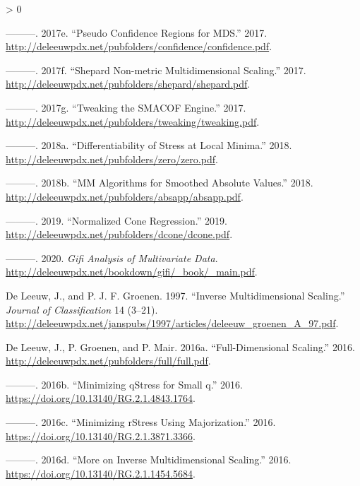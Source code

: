 \documentclass[
  12pt,
]{book}
\newlength{\cslhangindent}
\newenvironment{CSLReferences}[2] %
 {%
  \setlength{\parindent}{0pt}
  \ifodd #1 \everypar{\setlength{\hangindent}{\cslhangindent}}\ignorespaces\fi
  \ifnum #2 > 0
  \setlength{\parskip}{#2\baselineskip}
  \fi
 }%
 {}
\theoremstyle{definition}
\theoremstyle{definition}
\theoremstyle{definition}
\theoremstyle{definition}
\theoremstyle{remark}
\begin{document}
\begin{CSLReferences}{1}{0}
\leavevmode\hypertarget{ref-deleeuw_E_17q}{}%
---------. 2017e. {``{Pseudo Confidence Regions for MDS}.''} 2017. \url{http://deleeuwpdx.net/pubfolders/confidence/confidence.pdf}.

\leavevmode\hypertarget{ref-deleeuw_E_17e}{}%
---------. 2017f. {``{Shepard Non-metric Multidimensional Scaling}.''} 2017. \url{http://deleeuwpdx.net/pubfolders/shepard/shepard.pdf}.

\leavevmode\hypertarget{ref-deleeuw_E_17p}{}%
---------. 2017g. {``{Tweaking the SMACOF Engine}.''} 2017. \url{http://deleeuwpdx.net/pubfolders/tweaking/tweaking.pdf}.

\leavevmode\hypertarget{ref-deleeuw_E_18c}{}%
---------. 2018a. {``{Differentiability of Stress at Local Minima}.''} 2018. \url{http://deleeuwpdx.net/pubfolders/zero/zero.pdf}.

\leavevmode\hypertarget{ref-deleeuw_E_18f}{}%
---------. 2018b. {``{MM Algorithms for Smoothed Absolute Values}.''} 2018. \url{http://deleeuwpdx.net/pubfolders/absapp/absapp.pdf}.

\leavevmode\hypertarget{ref-deleeuw_E_19d}{}%
---------. 2019. {``Normalized Cone Regression.''} 2019. \url{http://deleeuwpdx.net/pubfolders/dcone/dcone.pdf}.

\leavevmode\hypertarget{ref-deleeuw_B_20}{}%
---------. 2020. \emph{{Gifi Analysis of Multivariate Data}}. \url{http://deleeuwpdx.net/bookdown/gifi/_book/_main.pdf}.

\leavevmode\hypertarget{ref-deleeuw_groenen_A_97}{}%
De Leeuw, J., and P. J. F. Groenen. 1997. {``Inverse Multidimensional Scaling.''} \emph{Journal of Classification} 14 (3--21). \url{http://deleeuwpdx.net/janspubs/1997/articles/deleeuw_groenen_A_97.pdf}.

\leavevmode\hypertarget{ref-deleeuw_groenen_mair_E_16e}{}%
De Leeuw, J., P. Groenen, and P. Mair. 2016a. {``Full-Dimensional Scaling.''} 2016. \url{http://deleeuwpdx.net/pubfolders/full/full.pdf}.

\leavevmode\hypertarget{ref-deleeuw_groenen_mair_E_16h}{}%
---------. 2016b. {``Minimizing qStress for Small q.''} 2016. \url{https://doi.org/10.13140/RG.2.1.4843.1764}.

\leavevmode\hypertarget{ref-deleeuw_groenen_mair_E_16a}{}%
---------. 2016c. {``{Minimizing rStress Using Majorization}.''} 2016. \url{https://doi.org/10.13140/RG.2.1.3871.3366}.

\leavevmode\hypertarget{ref-deleeuw_groenen_mair_E_16f}{}%
---------. 2016d. {``More on Inverse Multidimensional Scaling.''} 2016. \url{https://doi.org/10.13140/RG.2.1.1454.5684}.


\end{CSLReferences}
\end{document}
